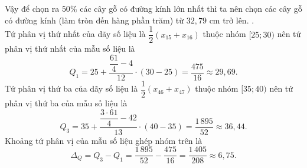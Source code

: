 \begin{ex}
{\begin{itemchoice}
Vậy để chọn ra $50\%$ các cây gỗ có đường kính lớn nhất thì ta nên chọn các cây gỗ có đường kính (làm tròn đến hàng phần trăm) từ $32{,}79$ cm trở lên.
.\\
Tứ phân vị thứ nhất của dãy số liệu là $\dfrac{1}{2}(x_{15}+x_{16})$ thuộc nhóm $[25;30)$ nên tứ phân vị thứ nhất của mẫu số liệu là 
\[Q_1=25+\dfrac{\dfrac{61}{4}-4}{12}\cdot (30-25)=\dfrac{475}{16}\approx 29{,}69.\]
Tứ phân vị thứ ba của dãy số liệu là $\dfrac{1}{2}(x_{46}+x_{47})$ thuộc nhóm $[35;40)$ nên tứ phân vị thứ ba của mẫu số liệu là 
\[Q_3=35+\dfrac{\dfrac{3\cdot 61}{4}-42}{13}\cdot (40-35)=\dfrac{1\,895}{52}\approx 36{,}44.\]
Khoảng tứ phân vị của mẫu số liệu ghép nhóm trên là \[\Delta_Q=Q_3-Q_1=\dfrac{1\,895}{52}-\dfrac{475}{16}=\dfrac{1\,405}{208}\approx 6{,}75.\]
\end{itemchoice}
}
\end{ex}

